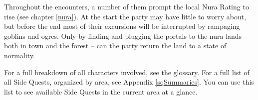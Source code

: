 \begin{multicols}{2}
\begin{exampletext}
\end{exampletext}

Throughout the encounters, a number of them prompt the local Nura Rating to rise (see chapter \ref{nura}).
At the start the party may have little to worry about, but before the end most of their excursions will be interrupted by rampaging goblins and ogres.
Only by finding and plugging the portals to the nura lands -- both in \gls{town} and the forest -- can the party return the land to a state of normality.

For a full breakdown of all characters involved, see the glossary.
For a full list of all Side Quests, organized by area, see Appendix \ref{sqSummaries}.
You can use this list to see available Side Quests in the current area at a glance.

\end{multicols}

